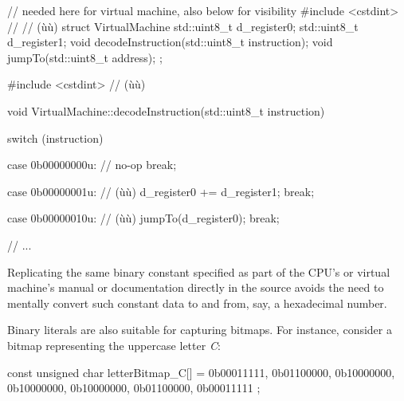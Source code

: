 %
%
%
%
\begin{emcppshiddenlisting}[emcppsbatch=e2]
// needed here for virtual machine, also below for visibility
#include <cstdint>  // // (ù{}ù)
struct VirtualMachine {
    std::uint8_t d_register0;
    std::uint8_t d_register1;
    void decodeInstruction(std::uint8_t instruction);
    void jumpTo(std::uint8_t address);
};
\end{emcppshiddenlisting}
\begin{emcppslisting}[emcppsbatch=e2]
#include <cstdint>  // (ù{}ù)

void VirtualMachine::decodeInstruction(std::uint8_t instruction)
{
    switch (instruction)
    {
        case 0b00000000u:  // no-op
            break;

        case 0b00000001u:  // (ù{}ù)
            d_register0 += d_register1;
            break;

        case 0b00000010u:  // (ù{}ù)
            jumpTo(d_register0);
            break;

        // ...
    }
}
\end{emcppslisting}

\noindent Replicating the same binary constant specified as part of the CPU's or
virtual machine's manual or documentation directly in the source avoids the need to
mentally convert such constant data to and from, say, a hexadecimal
number.

Binary literals are also suitable for capturing bitmaps. For instance,
consider a bitmap representing the uppercase letter \textit{C}\/:

\begin{emcppslisting}
const unsigned char letterBitmap_C[] =
{
    0b00011111,
    0b01100000,
    0b10000000,
    0b10000000,
    0b10000000,
    0b01100000,
    0b00011111
};
\end{emcppslisting}


